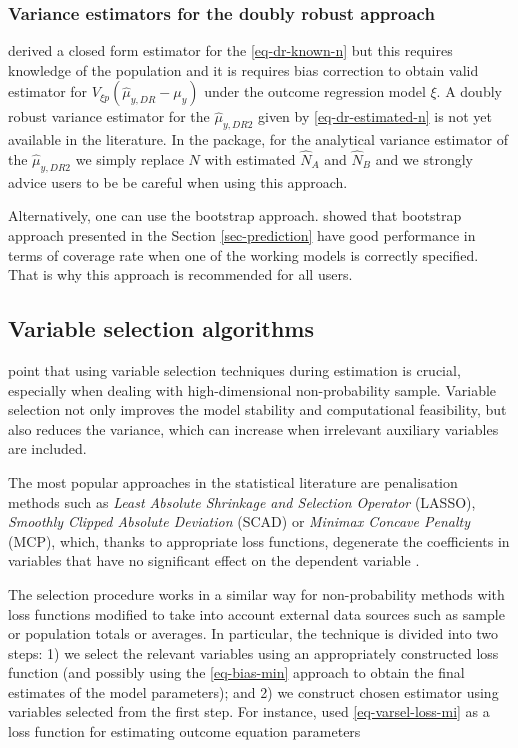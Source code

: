 \documentclass[
]{jss}
\begin{document}
\subsubsection{Variance estimators for the doubly robust
approach}\label{variance-estimators-for-the-doubly-robust-approach}

\citet{yang_doubly_2020} derived a closed form estimator for the
\eqref{eq-dr-known-n} but this requires knowledge of the population and
it is requires bias correction to obtain valid estimator for
\(V_{\xi p}\left(\hat{\mu}_{y,DR}-\mu_y\right)\) under the outcome
regression model \(\xi\). A doubly robust variance estimator for the
\(\hat{\mu}_{y,DR2}\) given by \eqref{eq-dr-estimated-n} is not yet
available in the literature. In the package, for the analytical variance
estimator of the \(\hat{\mu}_{y,DR2}\) we simply replace \(N\) with
estimated \(\hat{N}_A\) and \(\hat{N}_B\) and we strongly advice users
to be be careful when using this approach.

Alternatively, one can use the bootstrap approach.
\citet{chen2020doubly} showed that bootstrap approach presented in the
Section \ref{sec-prediction} have good performance in terms of coverage
rate when one of the working models is correctly specified. That is why
this approach is recommended for all users.

\subsection{Variable selection algorithms}\label{sec-varsel}

\citet{yang_asymptotic_2020} point that using variable selection
techniques during estimation is crucial, especially when dealing with
high-dimensional non-probability sample. Variable selection not only
improves the model stability and computational feasibility, but also
reduces the variance, which can increase when irrelevant auxiliary
variables are included.

The most popular approaches in the statistical literature are
penalisation methods such as
\textit{Least Absolute Shrinkage and Selection Operator} (LASSO),
\textit{Smoothly Clipped Absolute Deviation} (SCAD) or
\textit{Minimax Concave Penalty} (MCP), which, thanks to appropriate
loss functions, degenerate the coefficients in variables that have no
significant effect on the dependent variable
\citep[cf.][]{tibshirani1996regression, ncvreg}.

The selection procedure works in a similar way for non-probability
methods with loss functions modified to take into account external data
sources such as sample or population totals or averages. In particular,
the technique is divided into two steps: 1) we select the relevant
variables using an appropriately constructed loss function (and possibly
using the \eqref{eq-bias-min} approach to obtain the final estimates of
the model parameters); and 2) we construct chosen estimator using
variables selected from the first step. For instance,
\citet{yang_doubly_2020} used \eqref{eq-varsel-loss-mi} as a loss
function for estimating outcome equation parameters
\end{document}
